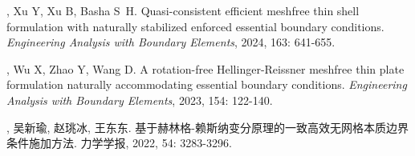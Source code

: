 \vspace{-50pt}
\begin{thebibliography}{1}

	, Xu Y, Xu B, Basha S~H.
	\newblock Quasi-consistent efficient meshfree thin shell formulation with
	  naturally stabilized enforced essential boundary conditions.
	\newblock \emph{Engineering Analysis with Boundary Elements}, 2024, 163:
	  641-655.

	, Wu X, Zhao Y, Wang D.
	\newblock A rotation-free {{Hellinger-Reissner}} meshfree thin plate
	  formulation naturally accommodating essential boundary conditions.
	\newblock \emph{Engineering Analysis with Boundary Elements}, 2023, 154:
	  122-140.

	, 吴新瑜, 赵珧冰, 王东东.
	\newblock
	  {基于赫林格-赖斯纳变分原理的一致高效无网格本质边界条件施加方法}.
	\newblock 力学学报, 2022, 54: 3283-3296.

\end{thebibliography}

